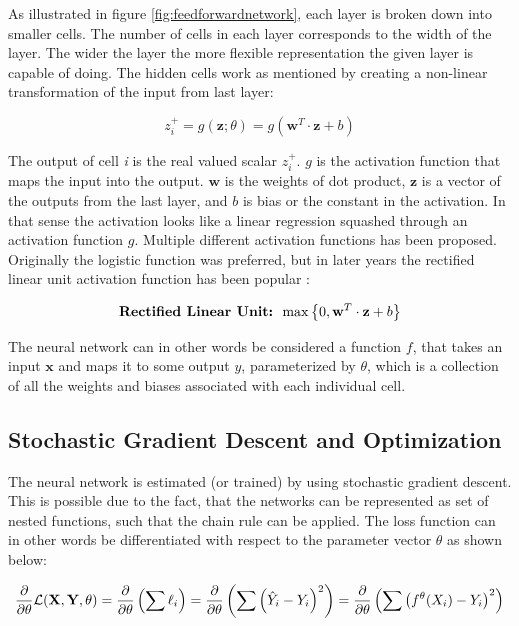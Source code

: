 As illustrated in figure \ref{fig:feedforwardnetwork}, each layer is broken down into smaller cells. The number of cells in each layer corresponds to the width of the layer. The wider the layer the more flexible representation the given layer is capable of doing. The hidden cells work as mentioned by creating a non-linear transformation of the input from last layer:

\begin{equation}
    z_i^{+} = g(\textbf{z}; \theta) = g(\textbf{w}^T \cdot \textbf{z} + b)
\end{equation}

The output of cell \textit{i} is the real valued scalar $z_i^+$. $g$ is the activation function that maps the input into the output. $\textbf{w}$ is the weights of dot product, $\textbf{z}$ is a vector of the outputs from the last layer, and $b$ is bias or the constant in the activation. In that sense the activation looks like a linear regression squashed through an activation function $g$. Multiple different activation functions has been proposed. Originally the logistic function was preferred, but in later years the rectified linear unit activation function has been popular \parencite{goodfellow_deep_2016}:

\begin{equation}
    \textbf{Rectified Linear Unit: }  \max \left\{ 0, \textbf{w}^T \cdot \textbf{z} + b \right\}
\end{equation}

The neural network can in other words be considered a function $f$, that takes an input $\textbf{x}$ and maps it to some output $y$, parameterized by $\theta$, which is a collection of all the weights and biases associated with each individual cell.

\subsection{Stochastic Gradient Descent and Optimization}

The neural network is estimated (or trained) by using stochastic gradient descent. This is possible due to the fact, that the networks can be represented as set of nested functions, such that the chain rule can be applied. The loss function can in other words be differentiated with respect to the parameter vector $\theta$ as shown below:

\begin{equation}\label{eq:loss_function}
    \frac{\partial}{\partial\theta} \mathcal{L} (\textbf{X}, \textbf{Y}, \theta) = \frac{\partial}{\partial\theta} \left( \sum \ell_i \right) = \frac{\partial}{\partial\theta} \left( \sum \left( \hat{Y}_i  - Y_i \right)^2 \right) = \frac{\partial}{\partial\theta} \left( \sum \left( f^{\theta}(X_i)  - Y_i \right)^2 \right)
\end{equation}

